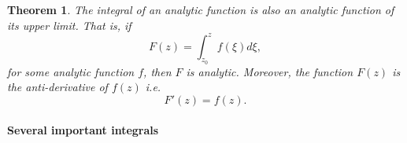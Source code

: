 \documentclass[12pt]{article}
\newcommand{\bbN}{\mathbb{N}}
\newtheorem{thm}{Theorem}[section]
\theoremstyle{definition}
\theoremstyle{remark}
\numberwithin{equation}{section}
\begin{document}


\begin{thm}
The integral of an analytic function is also an analytic function of its upper limit. That is, if 
\begin{equation}
  F(z) = \int_{z_0}^z f(\xi)d\xi,
\end{equation}
for some analytic function $f$, then $F$ is analytic. Moreover, the function $F(z)$ is the anti-derivative of $f(z)$ i.e.
\begin{equation}
  F'(z) = f(z).
\end{equation}
\end{thm}

\paragraph{Several important integrals}%
\label{par:several_important_integrals}



\end{document}
